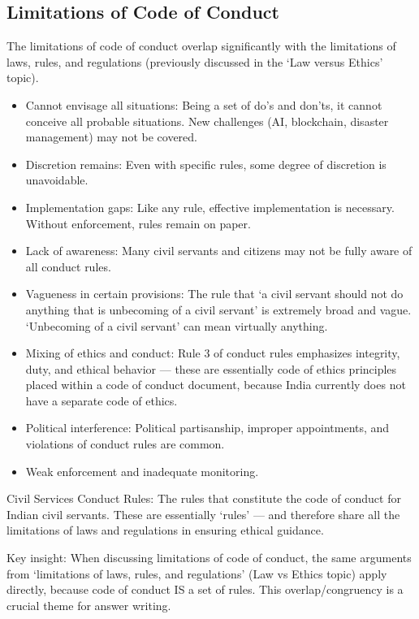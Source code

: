 \subsection{Limitations of Code of Conduct}
The limitations of code of conduct overlap significantly with the limitations of laws, rules, and regulations (previously discussed in the `Law versus Ethics' topic).
\begin{itemize}
\item Cannot envisage all situations: Being a set of do's and don'ts, it cannot conceive all probable situations. New challenges (AI, blockchain, disaster management) may not be covered.
\item Discretion remains: Even with specific rules, some degree of discretion is unavoidable.
\item Implementation gaps: Like any rule, effective implementation is necessary. Without enforcement, rules remain on paper.
\item Lack of awareness: Many civil servants and citizens may not be fully aware of all conduct rules.
\item Vagueness in certain provisions: The rule that `a civil servant should not do anything that is unbecoming of a civil servant' is extremely broad and vague. `Unbecoming of a civil servant' can mean virtually anything.
\item Mixing of ethics and conduct: Rule 3 of conduct rules emphasizes integrity, duty, and ethical behavior --- these are essentially code of ethics principles placed within a code of conduct document, because India currently does not have a separate code of ethics.
\item Political interference: Political partisanship, improper appointments, and violations of conduct rules are common.
\item Weak enforcement and inadequate monitoring.
\end{itemize}

\begin{GovtPolicy}
Civil Services Conduct Rules: The rules that constitute the code of conduct for Indian civil servants. These are essentially `rules' --- and therefore share all the limitations of laws and regulations in ensuring ethical guidance.
\end{GovtPolicy}

\begin{CriticalPoint}
Key insight: When discussing limitations of code of conduct, the same arguments from `limitations of laws, rules, and regulations' (Law vs Ethics topic) apply directly, because code of conduct IS a set of rules. This overlap/congruency is a crucial theme for answer writing.
\end{CriticalPoint}

